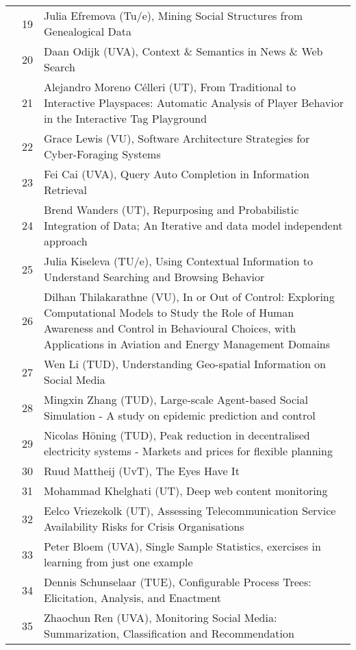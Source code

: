 {\begin{xltabular}{\linewidth}{@{} l @{\hspace{0.5em}} l @{\hspace{1em}} X @{}}
        &	 19	&	 Julia Efremova (Tu/e), Mining Social Structures from Genealogical Data\\
        &	 20	&	 Daan Odijk (UVA), Context \& Semantics in News \& Web Search\\
        &	 21	&	 Alejandro Moreno C\'{e}lleri (UT), From Traditional to Interactive Playspaces: Automatic Analysis of Player Behavior in the Interactive Tag Playground\\
        &	 22	&	 Grace Lewis (VU), Software Architecture Strategies for Cyber-Foraging Systems\\
        &	 23	&	 Fei Cai (UVA), Query Auto Completion in Information Retrieval\\
        &	 24	&	 Brend Wanders (UT), Repurposing and Probabilistic Integration of Data; An Iterative and data model independent approach\\
        &	 25	&	 Julia Kiseleva (TU/e), Using Contextual Information to Understand Searching and Browsing Behavior\\
        &	 26	&	 Dilhan Thilakarathne (VU), In or Out of Control: Exploring Computational Models to Study the Role of Human Awareness and Control in Behavioural Choices, with Applications in Aviation and Energy Management Domains\\
        &	 27	&	 Wen Li (TUD), Understanding Geo-spatial Information on Social Media\\
        &	 28	&	 Mingxin Zhang (TUD), Large-scale Agent-based Social Simulation - A study on epidemic prediction and control\\
        &	 29	&	 Nicolas H\"{o}ning (TUD), Peak reduction in decentralised electricity systems - Markets and prices for flexible planning\\
        &	 30	&	 Ruud Mattheij (UvT), The Eyes Have It\\
        &	 31	&	 Mohammad Khelghati (UT), Deep web content monitoring\\
        &	 32	&	 Eelco Vriezekolk (UT), Assessing Telecommunication Service Availability Risks for Crisis Organisations\\
        &	 33	&	 Peter Bloem (UVA), Single Sample Statistics, exercises in learning from just one example\\
        &	 34	&	 Dennis Schunselaar (TUE), Configurable Process Trees: Elicitation, Analysis, and Enactment\\
        &	 35	&	 Zhaochun Ren (UVA), Monitoring Social Media: Summarization, Classification and Recommendation\\

\end{xltabular}}

